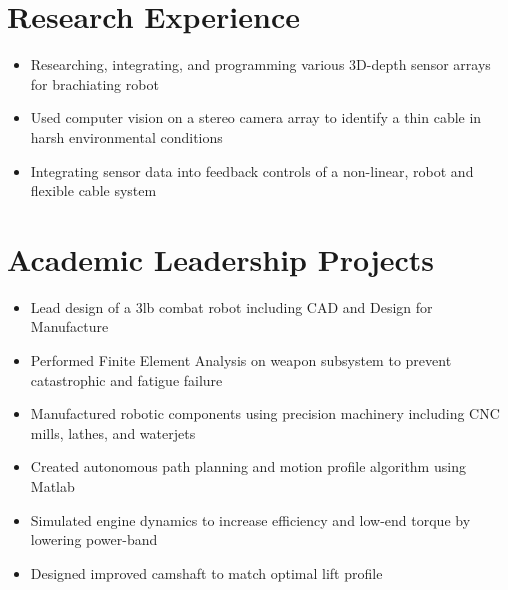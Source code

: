 \documentclass{resume}
\begin{document}
\section{Research Experience}
\begin{itemize}
  \item Researching, integrating, and programming various 3D-depth sensor arrays for brachiating robot
  \item Used computer vision on a stereo camera array to identify a thin cable in harsh environmental conditions
  \item Integrating sensor data into feedback controls of a non-linear, robot and flexible cable system
\end{itemize}

\section{Academic Leadership Projects}
\begin{itemize}
  \item Lead design of a 3lb combat robot including CAD and Design for Manufacture
  \item Performed Finite Element Analysis on weapon subsystem to prevent catastrophic and fatigue failure
  \item Manufactured robotic components using precision machinery including CNC mills, lathes, and waterjets
  \item Created autonomous path planning and motion profile algorithm using Matlab
\end{itemize}

\begin{itemize}
  \item Simulated engine dynamics to increase efficiency and low-end torque by lowering power-band
  \item Designed improved camshaft to match optimal lift profile
\end{itemize}
\end{document}

